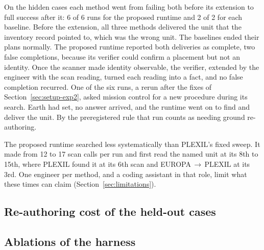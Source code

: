 On the hidden cases each method went from failing both before its extension to full success after it: 6 of 6 runs for
the proposed runtime and 2 of 2 for each baseline. Before the extension, all three methods delivered the unit that the
inventory record pointed to, which was the wrong unit. The baselines ended their plans normally. The proposed runtime
reported both deliveries as complete, two false completions, because its verifier could confirm a placement but not an
identity. Once the scanner made identity observable, the verifier, extended by the engineer with the scan reading,
turned each reading into a fact, and no false completion recurred. One of the six runs, a rerun after the fixes of
Section~\ref{sec:setup-exp2}, asked mission control for a new procedure during its search. Earth had set, no answer
arrived, and the runtime went on to find and deliver the unit. By the preregistered rule that run counts as needing
ground re-authoring.

The proposed runtime searched less systematically than PLEXIL's fixed sweep. It made from 12 to 17 scan calls per run
and first read the named unit at its 8th to 15th, where PLEXIL found it at its 6th scan and EUROPA\,$\rightarrow$\,PLEXIL
at its 3rd. One engineer per method, and a coding
assistant in that role, limit what these times can claim (Section~\ref{sec:limitations}).

\begin{table}[t]
  \centering
  \caption{Experiment II: engineering effort to reach the validation suite, and success on the hidden cases before and
  after the extension. Mission artifacts are the files of each method's own artifact set, namely prompts, contracts and
  runtime (Ours), plans (PLEXIL), and domain, host and offline test boundary (EUROPA\,$\rightarrow$\,PLEXIL).
  Supporting files: adapter, offline tests and documentation.}
  \label{tab:extension}
  \small
  
\end{table}

\subsection{Re-authoring cost of the held-out cases}
\label{sec:results-reauthoring}


\subsection{Ablations of the harness}
\label{sec:results-ablation}

